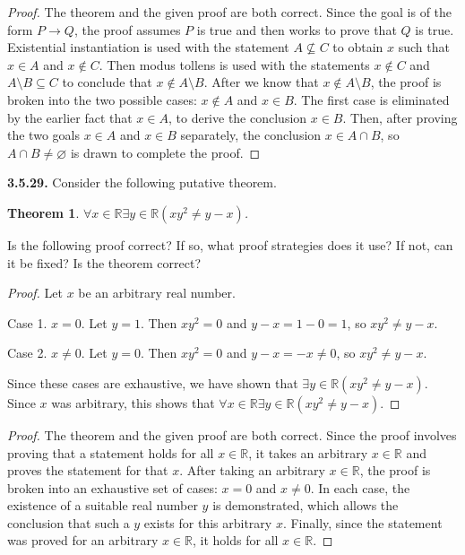 \documentclass[12pt]{amsart}
\newenvironment{statement}[1]{\smallskip\noindent\color[rgb]{.6627, .3529, .6314} {\bf #1.}}{}
\newtheorem{theorem}{Theorem}
\theoremstyle{definition}
\theoremstyle{remark}
\newcommand{\BR}{\mathbb R}
\begin{document}
\begin{proof}
The theorem and the given proof are both correct.
Since the goal is of the form $P \rightarrow Q$, the proof assumes $P$ is true and then works to prove that $Q$ is true.
Existential instantiation is used with the statement $A \nsubseteq C$ to obtain $x$ such that $x \in A$ and $x \notin C$.
Then modus tollens is used with the statements $x \notin C$ and $A \setminus B \subseteq C$ to conclude that $x \notin A \setminus B$.
After we know that $x \notin A \setminus B$, the proof is broken into the two possible cases: $x \notin A$ and $x \in B$.
The first case is eliminated by the earlier fact that $x \in A$, to derive the conclusion $x \in B$.
Then, after proving the two goals $x \in A$ and $x \in B$ separately, the conclusion $x \in A \cap B$, so $A \cap B \neq \varnothing$ is drawn to complete the proof.
\end{proof}


\begin{statement}{3.5.29}
Consider the following putative theorem.
\begin{theorem}
	$\forall x \in \BR \exists y \in \BR (xy^2 \neq y - x)$.
\end{theorem}
Is the following proof correct?
If so, what proof strategies does it use?
If not, can it be fixed?
Is the theorem correct?
\begin{proof}
	Let $x$ be an arbitrary real number.
	
	Case 1. $x = 0$.
	Let $y = 1$.
	Then $xy^2 = 0$ and $y - x = 1 - 0 = 1$, so $xy^2 \neq y - x$.
	
	Case 2. $x \neq 0$.
	Let $y = 0$.
	Then $xy^2 = 0$ and $y - x = - x \neq 0$, so $xy^2 \neq y - x$.
	
	Since these cases are exhaustive, we have shown that $\exists y \in \BR (xy^2 \neq y - x)$.
	Since $x$ was arbitrary, this shows that $\forall x \in \BR \exists y \in \BR (xy^2 \neq y - x)$.
\end{proof}
\end{statement}

\begin{proof}
The theorem and the given proof are both correct.
Since the proof involves proving that a statement holds for all $x \in \BR$, it takes an arbitrary $x \in \BR$ and proves the statement for that $x$.
After taking an arbitrary $x \in \BR$, the proof is broken into an exhaustive set of cases: $x = 0$ and $x \neq 0$.
In each case, the existence of a suitable real number $y$ is demonstrated, which allows the conclusion that such a $y$ exists for this arbitrary $x$.
Finally, since the statement was proved for an arbitrary $x \in \BR$, it holds for all $x \in \BR$.
\end{proof}
\end{document}
